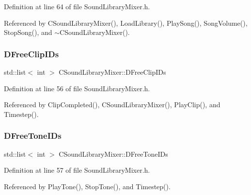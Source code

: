 Definition at line 64 of file Sound\+Library\+Mixer.\+h.



Referenced by C\+Sound\+Library\+Mixer(), Load\+Library(), Play\+Song(), Song\+Volume(), Stop\+Song(), and $\sim$\+C\+Sound\+Library\+Mixer().

\hypertarget{classCSoundLibraryMixer_a32956ae09580a1ae4c9c037f0f7b5c0b}{}\label{classCSoundLibraryMixer_a32956ae09580a1ae4c9c037f0f7b5c0b} 
\subsubsection{\texorpdfstring{D\+Free\+Clip\+I\+Ds}{DFreeClipIDs}}
{\footnotesize\ttfamily std\+::list$<$ int $>$ C\+Sound\+Library\+Mixer\+::\+D\+Free\+Clip\+I\+Ds\hspace{0.3cm}{\ttfamily [protected]}}



Definition at line 56 of file Sound\+Library\+Mixer.\+h.



Referenced by Clip\+Completed(), C\+Sound\+Library\+Mixer(), Play\+Clip(), and Timestep().

\hypertarget{classCSoundLibraryMixer_a2d1389368651db10fd6fd8b3cd08c164}{}\label{classCSoundLibraryMixer_a2d1389368651db10fd6fd8b3cd08c164} 
\subsubsection{\texorpdfstring{D\+Free\+Tone\+I\+Ds}{DFreeToneIDs}}
{\footnotesize\ttfamily std\+::list$<$ int $>$ C\+Sound\+Library\+Mixer\+::\+D\+Free\+Tone\+I\+Ds\hspace{0.3cm}{\ttfamily [protected]}}



Definition at line 57 of file Sound\+Library\+Mixer.\+h.



Referenced by Play\+Tone(), Stop\+Tone(), and Timestep().

\hypertarget{classCSoundLibraryMixer_a8f193156cafc61b64f04ed88dcabd27d}{}\label{classCSoundLibraryMixer_a8f193156cafc61b64f04ed88dcabd27d} 
